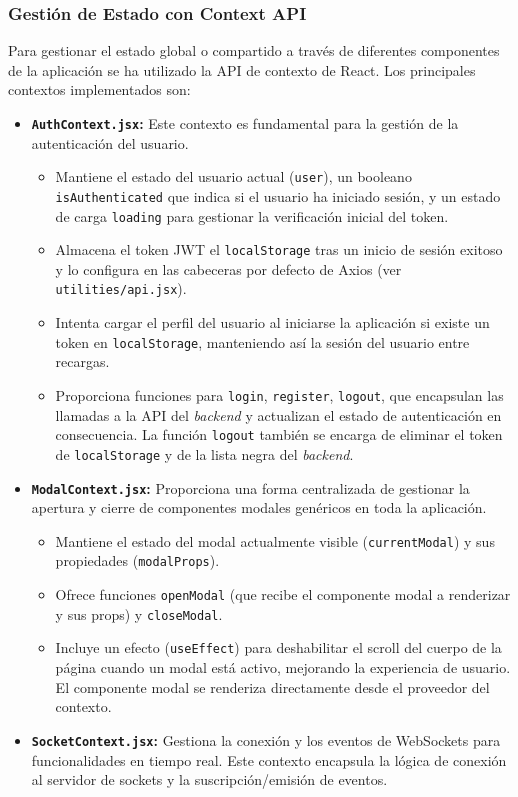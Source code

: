 \subsubsection{Gestión de Estado con Context API}
\label{sssec:frontendEstadoContext}

Para gestionar el estado global o compartido a través de diferentes componentes de la aplicación se ha utilizado la API de contexto de React. Los principales contextos implementados son:

\begin{itemize}
    \item \textbf{\texttt{AuthContext.jsx}:} Este contexto es fundamental para la gestión de la autenticación del usuario.
    \begin{itemize}
        \item Mantiene el estado del usuario actual (\texttt{user}), un booleano \texttt{isAuthenticated} que indica si el usuario ha iniciado sesión, y un estado de carga \texttt{loading} para gestionar la verificación inicial del token.
        \item Almacena el token JWT el \texttt{localStorage} tras un inicio de sesión exitoso y lo configura en las cabeceras por defecto de Axios (ver \texttt{utilities/api.jsx}).
        \item Intenta cargar el perfil del usuario al iniciarse la aplicación si existe un token en \texttt{localStorage}, manteniendo así la sesión del usuario entre recargas.
        \item Proporciona funciones para \texttt{login}, \texttt{register}, \texttt{logout}, que encapsulan las llamadas a la API del \textit{backend} y actualizan el estado de autenticación en consecuencia. La función \texttt{logout} también se encarga de eliminar el token de \texttt{localStorage} y de la lista negra del \textit{backend}.
    \end{itemize}
    \item \textbf{\texttt{ModalContext.jsx}:} Proporciona una forma centralizada de gestionar la apertura y cierre de componentes modales genéricos en toda la aplicación.
    \begin{itemize}
        \item Mantiene el estado del modal actualmente visible (\texttt{currentModal}) y sus propiedades (\texttt{modalProps}).
        \item Ofrece funciones \texttt{openModal} (que recibe el componente modal a renderizar y sus props) y \texttt{closeModal}.
        \item Incluye un efecto (\texttt{useEffect}) para deshabilitar el scroll del cuerpo de la página cuando un modal está activo, mejorando la experiencia de usuario. El componente modal se renderiza directamente desde el proveedor del contexto.
    \end{itemize}
    \item \textbf{\texttt{SocketContext.jsx}:} Gestiona la conexión y los eventos de WebSockets para funcionalidades en tiempo real. Este contexto encapsula la lógica de conexión al servidor de sockets y la suscripción/emisión de eventos.
\end{itemize}

